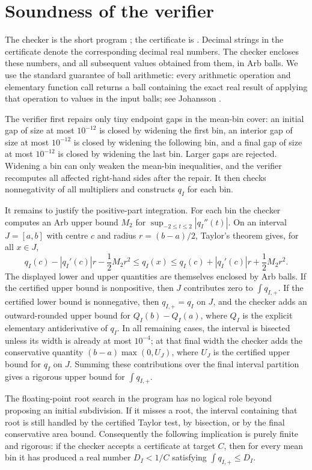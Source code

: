 \documentclass[a4paper]{amsart}
\begin{document}
\section{Soundness of the verifier}

The checker is the short program ; the certificate is .  Decimal strings in the certificate denote the corresponding decimal real numbers.  The checker encloses these numbers, and all subsequent values obtained from them, in Arb balls.  We use the standard guarantee of ball arithmetic: every arithmetic operation and elementary function call returns a ball containing the exact real result of applying that operation to values in the input balls; see Johansson \cite{Johansson2017}.

The verifier first repairs only tiny endpoint gaps in the mean-bin cover: an initial gap of size at most $10^{-12}$ is closed by widening the first bin, an interior gap of size at most $10^{-12}$ is closed by widening the following bin, and a final gap of size at most $10^{-12}$ is closed by widening the last bin.  Larger gaps are rejected.  Widening a bin can only weaken the mean-bin inequalities, and the verifier recomputes all affected right-hand sides after the repair.  It then checks nonnegativity of all multipliers and constructs $q_I$ for each bin.

It remains to justify the positive-part integration.  For each bin the checker computes an Arb upper bound $M_2$ for $\sup_{-2\le t\le2}|q_I''(t)|$.  On an interval $J=[a,b]$ with centre $c$ and radius $r=(b-a)/2$, Taylor's theorem gives, for all $x\in J$,
\[
 q_I(c)-|q_I'(c)|r-\frac12M_2r^2\le q_I(x)\le q_I(c)+|q_I'(c)|r+\frac12M_2r^2.
\]
The displayed lower and upper quantities are themselves enclosed by Arb balls.  If the certified upper bound is nonpositive, then $J$ contributes zero to $\int q_{I,+}$.  If the certified lower bound is nonnegative, then $q_{I,+}=q_I$ on $J$, and the checker adds an outward-rounded upper bound for $Q_I(b)-Q_I(a)$, where $Q_I$ is the explicit elementary antiderivative of $q_I$.  In all remaining cases, the interval is bisected unless its width is already at most $10^{-4}$; at that final width the checker adds the conservative quantity $(b-a)\max(0,U_J)$, where $U_J$ is the certified upper bound for $q_I$ on $J$.  Summing these contributions over the final interval partition gives a rigorous upper bound for $\int q_{I,+}$.

The floating-point root search in the program has no logical role beyond proposing an initial subdivision.  If it misses a root, the interval containing that root is still handled by the certified Taylor test, by bisection, or by the final conservative area bound.  Consequently the following implication is purely finite and rigorous: if the checker accepts a certificate at target $C$, then for every mean bin it has produced a real number $D_I<1/C$ satisfying $\int q_{I,+}\le D_I$.
\end{document}
